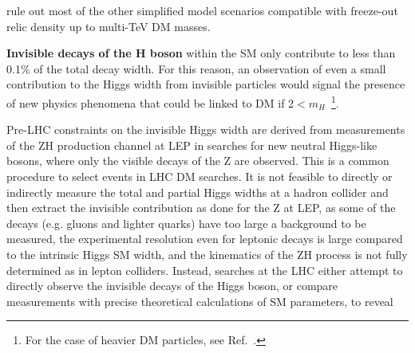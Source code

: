 rule out most of the other simplified model scenarios compatible with freeze-out relic density up to multi-TeV DM masses. 


\textbf{Invisible decays of the H boson} within the SM only contribute to less than 0.1\% of the total decay width. For this reason, an observation of even a small contribution to the Higgs width from invisible particles would signal the presence of new physics phenomena that could be linked to DM if 2\mdm $< m_H$~\footnote{For the case of heavier DM particles, see Ref.~\cite{Djouadi:2011aa}.}. 

Pre-LHC constraints on the invisible Higgs width are derived from measurements of the ZH production channel at LEP in searches for new neutral Higgs-like bosons, where only the visible decays of the Z are observed. This is a common procedure to select events in LHC DM searches. %
It is not feasible to directly or indirectly measure the total and partial Higgs widths at a hadron collider and then extract the invisible contribution as done for the Z at LEP, as some of the decays (e.g. gluons and lighter quarks) have too large a background to be measured, the experimental resolution even for leptonic decays is large compared to the intrinsic Higgs SM width, and the kinematics of the ZH process is not fully determined as in lepton colliders. %
Instead, searches at the LHC either attempt to directly observe the invisible decays of the Higgs boson, or compare measurements with precise theoretical calculations of SM parameters, to reveal
